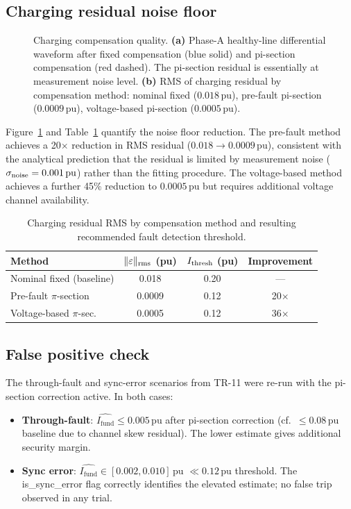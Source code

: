 \documentclass[11pt,a4paper]{article}
\newcommand{\Ifund}{I_{\mathrm{fund}}}
\newcommand{\eps}{\varepsilon}
\newcommand{\pu}{\,\text{pu}}
\begin{document}
\subsection{Charging residual noise floor}

\begin{figure}[h]
  \centering
  
  \caption{Charging compensation quality.
           \textbf{(a)} Phase-A healthy-line differential waveform after
           fixed compensation (blue solid) and pi-section compensation
           (red dashed).  The pi-section residual is essentially at
           measurement noise level.
           \textbf{(b)} RMS of charging residual by compensation method:
           nominal fixed ($0.018\pu$), pre-fault pi-section ($0.0009\pu$),
           voltage-based pi-section ($0.0005\pu$).}
  \label{fig:charging}
\end{figure}

Figure~\ref{fig:charging} and Table~\ref{tab:noise} quantify the noise floor
reduction.  The pre-fault method achieves a 20$\times$ reduction in RMS
residual ($0.018 \to 0.0009\pu$), consistent with the analytical prediction
that the residual is limited by measurement noise ($\sigma_{\rm noise} = 0.001\pu$)
rather than the fitting procedure.  The voltage-based method achieves a
further 45\% reduction to $0.0005\pu$ but requires additional voltage channel
availability.

\begin{table}[h]
  \centering
  \caption{Charging residual RMS by compensation method and resulting
           recommended fault detection threshold.}
  \label{tab:noise}
  \begin{tabular}{lccc}
    \toprule
    Method & $\|\eps\|_{\rm rms}$ (pu) & $I_{\rm thresh}$ (pu) & Improvement \\
    \midrule
    Nominal fixed (baseline) & 0.018 & 0.20 & --- \\
    Pre-fault $\pi$-section  & 0.0009 & 0.12 & 20$\times$ \\
    Voltage-based $\pi$-sec. & 0.0005 & 0.12 & 36$\times$ \\
    \bottomrule
  \end{tabular}
\end{table}

\subsection{False positive check}

The through-fault and sync-error scenarios from TR-11 were re-run with the
pi-section correction active.  In both cases:
\begin{itemize}
  \item \textbf{Through-fault}: $\hat{\Ifund} \leq 0.005\pu$ after pi-section
        correction (cf.\ $\leq 0.08\pu$ baseline due to channel skew residual).
        The lower estimate gives additional security margin.
  \item \textbf{Sync error}: $\hat{\Ifund} \in [0.002, 0.010]\pu$ $\ll
        0.12\pu$ threshold.  The is\_sync\_error flag correctly identifies the
        elevated estimate; no false trip observed in any trial.
\end{itemize}
\end{document}
